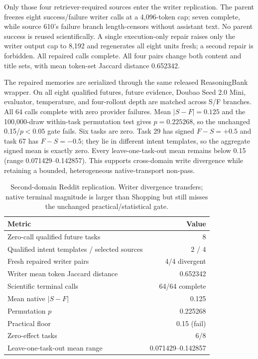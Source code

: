 Only those four retriever-required sources enter the writer replication. The parent freezes eight success/failure writer calls at a 4,096-token cap; seven complete, while source 610's failure branch length-censors without assistant text. No parent success is reused scientifically. A single execution-only repair raises only the writer output cap to 8,192 and regenerates all eight units fresh; a second repair is forbidden. All repaired calls complete. All four pairs change both content and title sets, with mean token-set Jaccard distance 0.652342.

The repaired memories are serialized through the same released ReasoningBank wrapper. On all eight qualified futures, future evidence, Doubao Seed 2.0 Mini, evaluator, temperature, and four-rollout depth are matched across S/F branches. All 64 calls complete with zero provider failures. Mean $|S-F|=0.125$ and the 100,000-draw within-task permutation test gives $p=0.225268$, so the unchanged 0.15/$p<0.05$ gate fails. Six tasks are zero. Task 29 has signed $F-S=+0.5$ and task 67 has $F-S=-0.5$; they lie in different intent templates, so the aggregate signed mean is exactly zero. Every leave-one-task-out mean remains below 0.15 (range 0.071429--0.142857). This supports cross-domain write divergence while retaining a bounded, heterogeneous native-transport non-pass.

\begin{table}[h]
\centering
\small
\caption{Second-domain Reddit replication. Writer divergence transfers; native terminal magnitude is larger than Shopping but still misses the unchanged practical/statistical gate.}
\label{tab:b12-reddit}
\begin{tabular}{lr}
\toprule
Metric & Value \\
\midrule
Zero-call qualified future tasks & 8 \\
Qualified intent templates / selected sources & 2 / 4 \\
Fresh repaired writer pairs & 4/4 divergent \\
Writer mean token Jaccard distance & 0.652342 \\
Scientific terminal calls & 64/64 complete \\
Mean native $|S-F|$ & 0.125 \\
Permutation $p$ & 0.225268 \\
Practical floor & 0.15 (fail) \\
Zero-effect tasks & 6/8 \\
Leave-one-task-out mean range & 0.071429--0.142857 \\
\bottomrule
\end{tabular}
\end{table}

